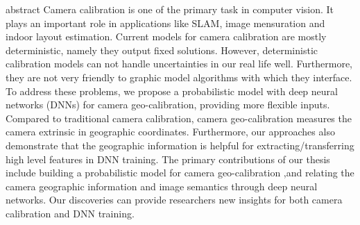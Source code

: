 abstract
Camera calibration is one of the primary task in computer vision.
It plays an important role in applications like SLAM, image
mensuration and indoor layout estimation. Current models for camera
calibration are mostly deterministic, namely they output fixed
solutions. 
However, deterministic calibration models can not handle uncertainties
in our real life well. Furthermore, they are not very friendly to
graphic model algorithms with which they interface.
To address these problems, we propose a probabilistic model with deep
neural networks (DNNs) for camera geo-calibration, providing more
flexible inputs. Compared to traditional camera calibration,
camera geo-calibration measures the camera extrinsic in geographic
coordinates.  Furthermore, our approaches also demonstrate that the
geographic information is helpful for extracting/transferring high
level features in DNN training.  The primary contributions of our
thesis include building a probabilistic model for camera
geo-calibration ,and relating the camera geographic information and
image semantics through deep neural networks. Our discoveries can
provide researchers new insights for both camera calibration and DNN
training.
